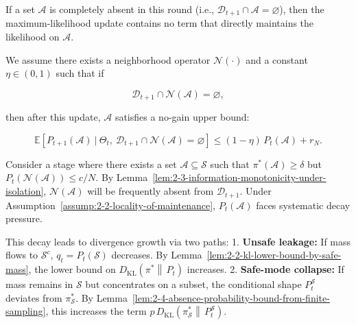 \begin{observation}\label{obs:2-1-no-maintenance-signal-for-missing-samples}

If a set $\mathcal{A}$ is completely absent in this round (i.e., $\mathcal{D}_{t+1}\cap\mathcal{A}=\varnothing$), then the maximum-likelihood update contains no term that directly maintains the likelihood on $\mathcal{A}$.
\end{observation}

\begin{assumption}\label{assump:2-2-locality-of-maintenance}

We assume there exists a neighborhood operator $\mathcal{N}(\cdot)$ and a constant $\eta\in(0,1)$ such that if

\[
\mathcal{D}_{t+1}\cap \mathcal{N}(\mathcal{A})=\varnothing,
\]

then after this update, $\mathcal{A}$ satisfies a no-gain upper bound:

\[
\mathbb{E}\!\left[P_{t+1}(\mathcal{A})\ \big|\ \Theta_t,\ \mathcal{D}_{t+1}\cap \mathcal{N}(\mathcal{A})=\varnothing\right] \le (1-\eta)\,P_t(\mathcal{A}) + r_N.
\]
\end{assumption}

\begin{theorem}\label{thm:2-1-from-coverage-loss-to-divergence-growth}

Consider a stage where there exists a set $\mathcal{A}\subseteq \mathcal{S}$ such that $\pi^\ast(\mathcal{A})\ge\delta$ but $P_t(\mathcal{N}(\mathcal{A}))\le c/N$. By Lemma~\ref{lem:2-3-information-monotonicity-under-isolation}, $\mathcal{N}(\mathcal{A})$ will be frequently absent from $\mathcal{D}_{t+1}$. Under Assumption~\ref{assump:2-2-locality-of-maintenance}, $P_t(\mathcal{A})$ faces systematic decay pressure.

This decay leads to divergence growth via two paths:
1.  \textbf{Unsafe leakage:} If mass flows to $\mathcal{S}^c$, $q_t=P_t(\mathcal{S})$ decreases. By Lemma~\ref{lem:2-2-kl-lower-bound-by-safe-mass}, the lower bound on $D_{\mathrm{KL}}\!\left(\pi^\ast \middle\|\, P_t\right)$ increases.
2.  \textbf{Safe-mode collapse:} If mass remains in $\mathcal{S}$ but concentrates on a subset, the conditional shape $P^{\mathcal{S}}_t$ deviates from $\pi^\ast_{\mathcal{S}}$. By Lemma~\ref{lem:2-4-absence-probability-bound-from-finite-sampling}, this increases the term $p\,D_{\mathrm{KL}}\!\left(\pi^\ast_{\mathcal{S}} \middle\|\, P^{\mathcal{S}}_t\right)$.

\end{theorem}

